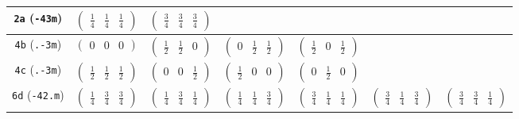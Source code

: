 \documentclass[fleqn,9pt,landscape]{jsarticle}
\begin{document}
\begin{center}
\begin{longtable}{ccccccc}
{\tt 2a} ({\tt -43m}) & $ \begin{pmatrix} \frac{1}{4} & \frac{1}{4} & \frac{1}{4} \end{pmatrix} $ & $ \begin{pmatrix} \frac{3}{4} & \frac{3}{4} & \frac{3}{4} \end{pmatrix} $ & $  $ & $  $ & $  $ & $  $ \\ \hline
{\tt 4b} ({\tt .-3m}) & $ \begin{pmatrix} 0 & 0 & 0 \end{pmatrix} $ & $ \begin{pmatrix} \frac{1}{2} & \frac{1}{2} & 0 \end{pmatrix} $ & $ \begin{pmatrix} 0 & \frac{1}{2} & \frac{1}{2} \end{pmatrix} $ & $ \begin{pmatrix} \frac{1}{2} & 0 & \frac{1}{2} \end{pmatrix} $ & $  $ & $  $ \\ \hline
{\tt 4c} ({\tt .-3m}) & $ \begin{pmatrix} \frac{1}{2} & \frac{1}{2} & \frac{1}{2} \end{pmatrix} $ & $ \begin{pmatrix} 0 & 0 & \frac{1}{2} \end{pmatrix} $ & $ \begin{pmatrix} \frac{1}{2} & 0 & 0 \end{pmatrix} $ & $ \begin{pmatrix} 0 & \frac{1}{2} & 0 \end{pmatrix} $ & $  $ & $  $ \\ \hline
{\tt 6d} ({\tt -42.m}) & $ \begin{pmatrix} \frac{1}{4} & \frac{3}{4} & \frac{3}{4} \end{pmatrix} $ & $ \begin{pmatrix} \frac{1}{4} & \frac{3}{4} & \frac{1}{4} \end{pmatrix} $ & $ \begin{pmatrix} \frac{1}{4} & \frac{1}{4} & \frac{3}{4} \end{pmatrix} $ & $ \begin{pmatrix} \frac{3}{4} & \frac{1}{4} & \frac{1}{4} \end{pmatrix} $ & $ \begin{pmatrix} \frac{3}{4} & \frac{1}{4} & \frac{3}{4} \end{pmatrix} $ & $ \begin{pmatrix} \frac{3}{4} & \frac{3}{4} & \frac{1}{4} \end{pmatrix} $ \\ \hline

\end{longtable}
\end{center}
\end{document}
